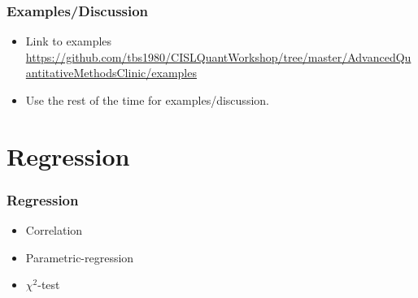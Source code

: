 \documentclass[10pt, compress]{beamer}
\begin{document}
\begin{frame}
    \frametitle{Examples/Discussion}
    \begin{itemize}
        \item Link to examples \url{https://github.com/tbs1980/CISLQuantWorkshop/tree/master/AdvancedQuantitativeMethodsClinic/examples}
        \item Use the rest of the time for examples/discussion.
    \end{itemize}
\end{frame}

\section{Regression}

\begin{frame}
    \frametitle{Regression}
    \begin{itemize}
        \item Correlation
        \item Parametric-regression
        \item $\chi^2$-test
    \end{itemize}
\end{frame}
\end{document}
